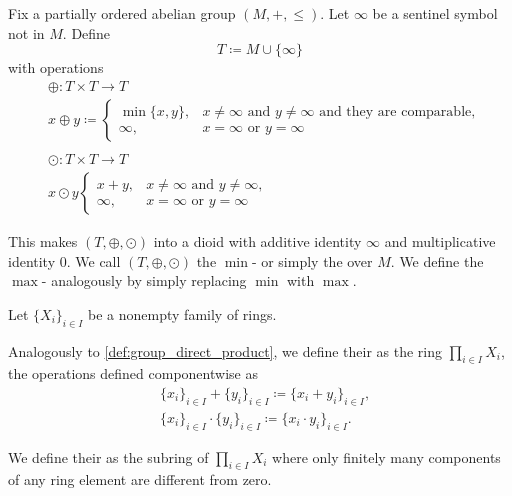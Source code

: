 \begin{definition}\label{def:tropical_semiring}\cite{nLab:tropical_semiring}
  Fix a partially ordered abelian group \( (M, +, \leq) \). Let \( \infty \) be a sentinel symbol not in \( M \). Define
  \begin{equation*}
    T \coloneqq M \cup \{ \infty \}
  \end{equation*}
  with operations
  \begin{align*}
    &\oplus: T \times T \to T \\
    &x \oplus y \coloneqq \begin{cases}
      \min \{ x, y \}, &x \neq \infty \text{ and } y \neq \infty \text{ and they are comparable}, \\
      \infty,     &x = \infty \text{ or } y = \infty
    \end{cases} \\
    \\
    &\odot: T \times T \to T \\
    &x \odot y \begin{cases}
      x + y,  &x \neq \infty \text{ and } y \neq \infty, \\
      \infty, &x = \infty \text{ or } y = \infty
    \end{cases}
  \end{align*}

  This makes \( (T, \oplus, \odot) \) into a dioid with additive identity \( \infty \) and multiplicative identity \( 0 \). We call \( (T, \oplus, \odot) \) the \( \min \)- or simply the  over \( M \). We define the \( \max \)- analogously by simply replacing \( \min \) with \( \max \).
\end{definition}

\begin{definition}\label{def:semiring_direct_product}
  Let \( \{ X_i \}_{i \in I} \) be a nonempty family of rings.

  Analogously to \cref{def:group_direct_product}, we define their  as the ring \( \prod_{i \in I} X_i \), the operations defined componentwise as
  \begin{align*}
    &\{ x_i \}_{i \in I} + \{ y_i \}_{i \in I}
    \coloneqq
    \{ x_i + y_i \}_{i \in I}, \\
    &\{ x_i \}_{i \in I} \cdot \{ y_i \}_{i \in I}
    \coloneqq
    \{ x_i \cdot y_i \}_{i \in I}.
  \end{align*}

  We define their  as the subring of \( \prod_{i \in I} X_i \) where only finitely many components of any ring element are different from zero.
\end{definition}

